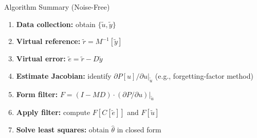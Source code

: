 \documentclass[hyperref={pdfpagemode=FullScreen},aspectratio=169]{beamer}
\begin{document}
\begin{frame}
      \begin{exampleblock}{Algorithm Summary (Noise-Free)}
        \begin{enumerate}
          \setlength{\itemsep}{0.4em}
          \item \textbf{Data collection:} obtain $\{\tilde{u}, \tilde{y}\}$
          \item \textbf{Virtual reference:} $\tilde{r} = M^{-1}[\tilde{y}]$
          \item \textbf{Virtual error:} $\tilde{e} = \tilde{r} - D\tilde{y}$
          \item \textbf{Estimate Jacobian:} identify $\partial P[u]/\partial u|_{\tilde{u}}$ (e.g., forgetting-factor method)
          \item \textbf{Form filter:} $F = (I-MD)\cdot(\partial P/\partial u)|_{\tilde{u}}$
          \item \textbf{Apply filter:} compute $F[C[\tilde{e}]]$ and $F[\tilde{u}]$
          \item \textbf{Solve least squares:} obtain $\hat\theta$ in closed form
        \end{enumerate}
      \end{exampleblock}
\end{frame}
\end{document}
